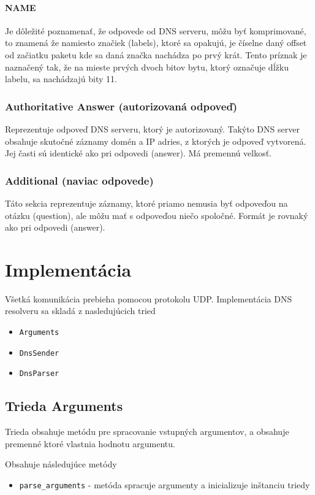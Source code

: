 \documentclass[titlepage]{article}
\begin{document}
\paragraph{NAME}
Je dôležité poznamenať, že odpovede od DNS serveru, môžu byť komprimované,
to znamená že namiesto značiek (labels), ktoré sa opakujú, je číselne daný offset
od začiatku paketu kde sa daná značka nachádza po prvý krát. Tento príznak je naznačený tak,
že na mieste prvých dvoch bitov bytu, ktorý označuje dĺžku labelu, sa nachádzajú bity 11.

\subsubsection{Authoritative Answer (autorizovaná odpoveď)}
Reprezentuje odpoveď DNS serveru, ktorý je autorizovaný. Takýto DNS server
obsahuje skutočné záznamy domén a IP adries, z ktorých je odpoveď vytvorená.
Jej časti sú identické ako pri odpovedi (answer). Má premennú velkosť. 

\subsubsection{Additional (naviac odpovede)}
Táto sekcia reprezentuje záznamy, ktoré priamo nemusia byť odpoveďou na otázku (question),
ale môžu mať s odpoveďou niečo spoločné. Formát je rovnaký ako pri odpovedi (answer).

\newpage
\section{Implementácia}
Všetká komunikácia prebieha pomocou protokolu UDP.
Implementácia DNS resolveru sa skladá z nasledujúcich tried
\begin{itemize}
    \item \verb|Arguments|
    \item \verb|DnsSender|
    \item \verb|DnsParser|
\end{itemize}

\subsection{Trieda Arguments}
Trieda obsahuje metódu pre spracovanie vstupných argumentov, a obsahuje premenné
ktoré vlastnia hodnotu argumentu.

Obsahuje následujúce metódy
\begin{itemize}
    \item \verb|parse_arguments| - metóda spracuje argumenty a inicializuje inštanciu triedy
\end{itemize}
\end{document}
